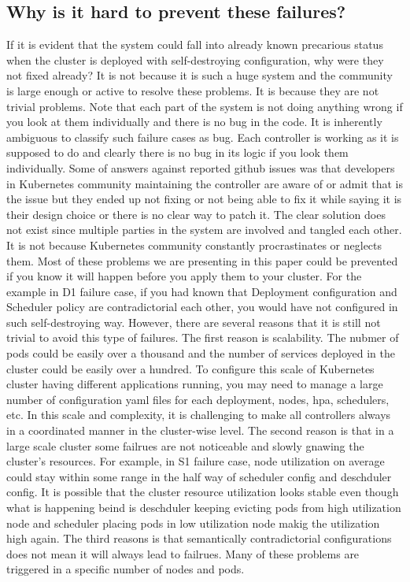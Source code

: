 \subsection*{Why is it hard to prevent these failures?}
If it is evident that the system could fall into already known precarious status when the cluster is deployed with self-destroying configuration, why were they not fixed already? It is not because it is such a huge system and the community is large enough or active to resolve these problems. It is because they are not trivial problems. Note that each part of the system is not doing anything wrong if you look at them individually and there is no bug in the code.
It is inherently ambiguous to classify such failure cases as bug. Each controller is working as it is supposed to do and clearly there is no bug in its logic if you look them individually. Some of answers against reported github issues was that developers in Kubernetes community maintaining the controller are aware of or admit that is the issue but they ended up not fixing or not being able to fix it while saying it is their design choice or there is no clear way to patch it. The clear solution does not exist since multiple parties in the system are involved and tangled each other. It is not because Kubernetes community constantly procrastinates or neglects them. 
Most of these problems we are presenting in this paper could be prevented if you know it will happen before you apply them to your cluster. For the example in D1 failure case, if you had known that Deployment configuration and Scheduler policy are contradictorial each other, you would have not configured in such self-destroying way. However, there are several reasons that it is still not trivial to avoid this type of failures. The first reason is scalability. The nubmer of pods could be easily over a thousand and the number of services deployed in the cluster could be easily over a hundred. To configure this scale of Kubernetes cluster having different applications running, you may need to manage a large number of configuration yaml files for each deployment, nodes, hpa, schedulers, etc. In this scale and complexity, it is challenging to make all controllers always in a coordinated manner in the cluster-wise level. The second reason is that in a large scale cluster some failrues are not noticeable and slowly gnawing the cluster's resources. For example, in S1 failure case, node utilization on average could stay within some range in the half way of scheduler config and deschduler config. It is possible that the cluster resource utilization looks stable even though what is happening beind is deschduler keeping evicting pods from high utilization node and scheduler placing pods in low utilization node makig the utilization high again. The third reasons is that semantically contradictorial configurations does not mean it will always lead to failrues. Many of these problems are triggered in a specific number of nodes and pods. 
